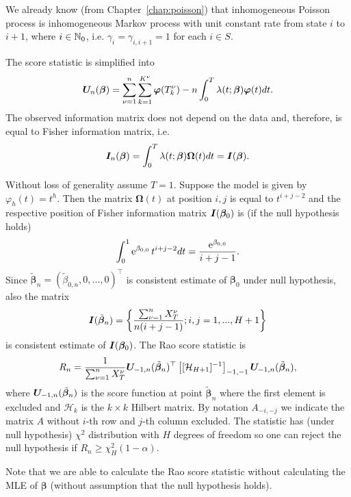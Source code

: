 {\begin{example}
	We already know (from Chapter~\ref{chap:poisson}) that inhomogeneous Poisson process is inhomogeneous Markov process with unit constant rate from state $i$ to $i+1$, where $i \in \mathbb{N}_0$, i.e. $\gamma_{i} = \gamma_{i,i+1} = 1$ for each $i \in S$. 
	
	The score statistic is simplified into
	\[
		\bm{U}_n (\bm{\beta})
		= \sum_{\nu=1}^n \sum_{k=1}^{K^{\nu}} \bm{\varphi} (T_k^{\nu})
		- n\int_{0}^{T} \lambda(t; \bm{\beta}) \bm{\varphi} (t) dt.
	\]
		The observed information matrix does not depend on the data and, therefore, is equal to Fisher information matrix, i.e. 
	\[
		\bm{I}_n (\bm{\beta}) =
		\int_{0}^{T} \lambda(t; \bm{\beta}) \bm{\Omega} (t) dt = 
		\bm{I} (\bm{\beta}).
	\]
	
		Without loss of generality assume $T = 1$. Suppose the model is given by $\varphi_h (t) = t^h$. Then the matrix $\bm{\Omega} (t)$ at position $i,j$ is equal to $t^{i+j-2}$ and the respective position of Fisher information matrix $\bm{I} (\bm{\beta}_0)$ is (if the null hypothesis holds)
		\[
			\int_0^1 \operatorname{\mathrm{e}}^{\beta_{0,0}} t^{i+j-2} dt = \frac{\operatorname{\mathrm{e}}^{\beta_{0,0}}}{i+j-1}.
		\]
		Since $\tilde{\bm{\beta}}_n = (\tilde{\beta}_{0,n}, 0, ..., 0)^{\top}$ is consistent estimate of $\bm{\beta}_0$ under null hypothesis, also the matrix
		\[
			\bm{I} (\tilde{\bm{\beta}}_n) = \left\{ \frac{\sum_{\nu = 1}^n X_T^{\nu}}{n (i+j-1)}; i,j = 1, ..., H+1 \right\}
		\]
		is consistent estimate of $\bm{I} (\bm{\beta}_0)$. The Rao score statistic is		
		\[
			R_n = \frac{1}{\sum_{\nu = 1}^n X_T^{\nu}} \bm{U}_{-1,n} (\tilde{\bm{\beta}}_n) ^{\top} \left[ [ \mathcal{H}_{H+1} ]^{-1} \right]_{-1,-1} \bm{U}_{-1,n} (\tilde{\bm{\beta}}_n),
		\]
		where $\bm{U}_{-1,n} (\tilde{\bm{\beta}}_n)$ is the score function at point $\tilde{\bm{\beta}}_n$ where the first element is excluded and $\mathcal{H}_k$ is the $k \times k$ Hilbert matrix. By notation $A_{-i,-j}$ we indicate the matrix $A$ without $i$-th row and $j$-th column excluded. 
		The statistic has (under null hypothesis) $\chi^2$ distribution with $H$ degrees of freedom so one can reject the  null hypothesis if $R_n \geq \chi_H^2(1-\alpha)$.
		
		Note that we are able to calculate the Rao score statistic without calculating the MLE of $\bm{\beta}$ (without assumption that the null hypothesis holds).
		
	\demo
\end{example}




}
